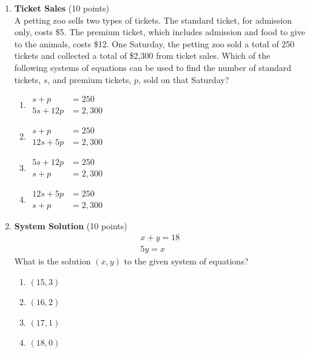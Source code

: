 \begin{enumerate}
  \item \textbf{Ticket Sales} (10 points)\\
  A petting zoo sells two types of tickets. The standard ticket, for admission only, costs \$5. The premium ticket, which includes admission and food to give to the animals, costs \$12. One Saturday, the petting zoo sold a total of 250 tickets and collected a total of \$2,300 from ticket sales. Which of the following systems of equations can be used to find the number of standard tickets, $s$, and premium tickets, $p$, sold on that Saturday?\\
  \begin{enumerate}[label=(\Alph*)]
    \item $\begin{aligned} s+p&=250 \\ 5s+12p&=2,300 \end{aligned}$
    \item $\begin{aligned} s+p&=250 \\ 12s+5p&=2,300 \end{aligned}$
    \item $\begin{aligned} 5s+12p&=250 \\ s+p&=2,300 \end{aligned}$
    \item $\begin{aligned} 12s+5p&=250 \\ s+p&=2,300 \end{aligned}$
  \end{enumerate}
  \begin{subanswer}
  \end{subanswer}

  \item \textbf{System Solution} (10 points)\\
  \[\begin{gathered}
  x+y=18 \\
  5y=x
  \end{gathered}\]
  What is the solution $(x,y)$ to the given system of equations?\\
  \begin{enumerate}[label=(\Alph*)]
    \item $(15,3)$
    \item $(16,2)$
    \item $(17,1)$
    \item $(18,0)$
  \end{enumerate}
  \begin{subanswer}
  \end{subanswer}


\end{enumerate}
